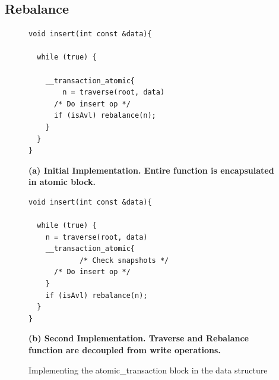 \documentclass[conference]{IEEEtran}
\theoremstyle{definition}
\theoremstyle{theorem}
\begin{document}
\subsection{Rebalance}

\begin{figure}[t]
 \centering
\begin{minipage}{0.49\textwidth}
\begin{lstlisting}
void insert(int const &data){

  while (true) {
  
    __transaction_atomic{
    	n = traverse(root, data)
      /* Do insert op */
      if (isAvl) rebalance(n);
    }
  }
}  
\end{lstlisting}
\textbf{(a) Initial Implementation. Entire function is encapsulated in atomic block.}
\end{minipage}
\begin{minipage}{0.49\textwidth}
{\begin{lstlisting}
void insert(int const &data){

  while (true) {
    n = traverse(root, data)
    __transaction_atomic{
			/* Check snapshots */
      /* Do insert op */
    }
   	if (isAvl) rebalance(n);
  }
}  
\end{lstlisting}
}
\textbf{(b) Second Implementation. Traverse and Rebalance function are decoupled from write operations.}
\end{minipage}
\caption{Implementing the atomic\_transaction block in the data structure}
\label{fig:stm:imp}
\end{figure}
\end{document}
